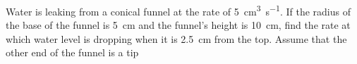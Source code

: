 
%
%
%
%
% 

\question[3] Water is leaking from a conical funnel at the rate of \SI{5}{\cubic\centi\metre\per\second}.
If the radius of the base of the funnel is \SI{5}{\centi\meter} and the funnel's height is 
\SI{10}{\centi\meter}, find the rate at which water level is dropping when it is 
\SI{2.5}{\centi\meter} from the top. Assume that the other end of the funnel is a tip

\ifprintanswers
\fi 

